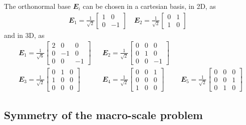 \documentclass[12pt,a4paper,fleqn]{article}
\renewcommand{\ts}[1]{\mathbfit{#1}}
\begin{document}
The orthonormal base $\ts E_i$ can be chosen in a cartesian basis, in 2D, as
\begin{align}
 \ts E_1 = \frac{1}{\sqrt{2}}\begin{bmatrix} 1 & 0\\ 0 & -1\end{bmatrix}\quad \ts E_2 = \frac{1}{\sqrt{2}}\begin{bmatrix} 0 & 1\\ 1 & 0\end{bmatrix}
\end{align}
and in 3D, as
\begin{align}
 &\ts E_1 = \frac{1}{\sqrt{6}}\begin{bmatrix} 2 & 0 & 0\\ 0 & -1 & 0\\ 0 & 0 & -1\end{bmatrix}
 &&\ts E_2 = \frac{1}{\sqrt{2}}\begin{bmatrix} 0 & 0 & 0\\ 0 & 1 & 0 \\ 0 & 0 & -1\end{bmatrix}
 &&\\
 &\ts E_3 = \frac{1}{\sqrt{2}}\begin{bmatrix} 0 & 1 & 0\\ 1 & 0 & 0 \\ 0 & 0 & 0\end{bmatrix}
 &&\ts E_4 = \frac{1}{\sqrt{2}}\begin{bmatrix} 0 & 0 & 1\\ 0 & 0 & 0 \\ 1 & 0 & 0\end{bmatrix}
 &&\ts E_5 = \frac{1}{\sqrt{2}}\begin{bmatrix} 0 & 0 & 0\\ 0 & 0 & 1 \\ 0 & 1 & 0\end{bmatrix}
\end{align}


\subsection{Symmetry of the macro-scale problem}
\end{document}
